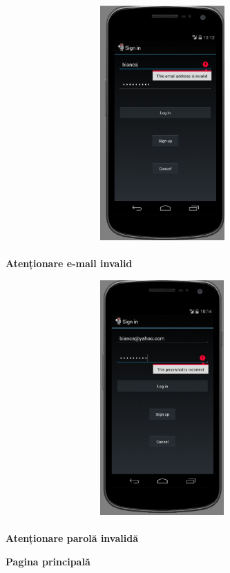 \begin{center}
\includegraphics[width=12cm,height=9cm,keepaspectratio]{imagini/emailinvalid.eps} %
\paragraph{}
\textbf{Atenționare e-mail invalid}
\end{center}

\begin{center}
\includegraphics[width=12cm,height=9cm,keepaspectratio]{imagini/invalidpass.eps} %
\paragraph{}
\textbf{Atenționare parolă invalidă}
\end{center}

\textbf{Pagina principală}
